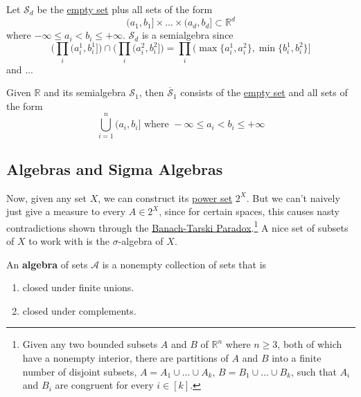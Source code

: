   \begin{example}
    \label{ex:the-semialgebra-of-half-open-boxes}
    Let $\mathcal{S}_d$ be the \hyperref[st-def:empty-set]{empty set} plus all sets of the form 
    \begin{equation}
      (a_1, b_1] \times \ldots \times (a_d, b_d] \subset \mathbb{R}^d
    \end{equation}
    where $-\infty \leq a_i < b_i \leq +\infty$. $\mathcal{S}_d$ is a semialgebra since 
    \begin{equation}
      \bigg( \prod_i (a_i^1 , b_i^1] \bigg) \cap \bigg( \prod_i (a_i^2, b_i^2] \bigg) = \prod_i (\max\{a_i^1, a_i^2\}, \min\{b_i^1, b_i^2\}]
    \end{equation}
    and ...
  \end{example}

  \begin{example}
    \label{ex:finite-disjoint-unions-over-a-semialgebra}
    Given $\mathbb{R}$ and its semialgebra $\mathcal{S}_1$, then $\overline{\mathcal{S}}_1$ consists of the \hyperref[st-def:empty-set]{empty set} and all sets of the form 
    \begin{equation}
      \bigcup_{i=1}^n (a_i, b_i] \text{ where } -\infty \leq a_i < b_i \leq +\infty
    \end{equation}
  \end{example}

\subsection{Algebras and Sigma Algebras} 

  Now, given any set $X$, we can construct its \hyperref[alg-ex:power-set]{power set} $2^X$. But we can't naively just give a measure to every $A \in 2^X$, since for certain spaces, this causes nasty contradictions shown through the \hyperref[st-thm:banach-tarski-paradox]{Banach-Tarski Paradox}.\footnote{Given any two bounded subsets $A$ and $B$ of $\mathbb{R}^n$ where $n \geq 3$, both of which have a nonempty interior, there are partitions of $A$ and $B$ into a finite number of disjoint subsets, $A = A_1 \cup \ldots \cup A_k$, $B = B_1 \cup \ldots \cup B_k$, such that $A_i$ and $B_i$ are congruent for every $i \in [k]$.} A nice set of subsets of $X$ to work with is the $\sigma$-algebra of $X$. 

	\begin{definition}[Algebra]
	  \label{def:algebra}
		An \textbf{algebra} of sets $\mathcal{A}$ is a nonempty collection of sets that is 
		\begin{enumerate}
		  \item closed under finite unions. 
			\item closed under complements. 
		\end{enumerate}
	\end{definition}

